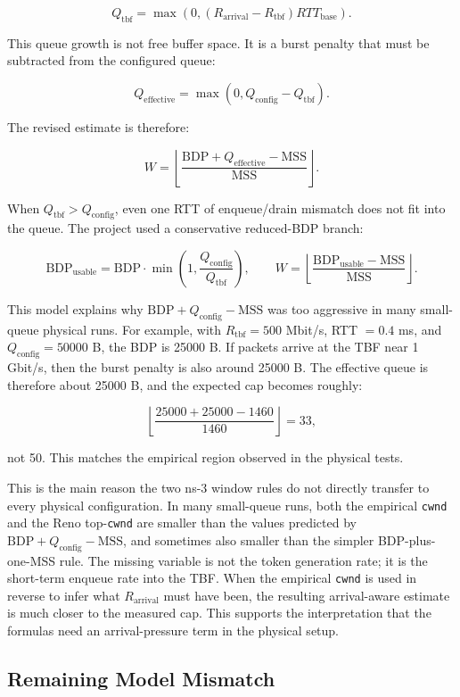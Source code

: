 \documentclass{article}
\newcommand{\code}[1]{\texttt{#1}}
\newcommand{\mss}{\mathrm{MSS}}
\newcommand{\bdp}{\mathrm{BDP}}
\begin{document}
\[
Q_{\mathrm{tbf}} =
\max(0, (R_{\mathrm{arrival}} - R_{\mathrm{tbf}}) RTT_{\mathrm{base}}).
\]

This queue growth is not free buffer space. It is a burst penalty that must be subtracted from the configured queue:

\[
Q_{\mathrm{effective}} = \max(0, Q_{\mathrm{config}} - Q_{\mathrm{tbf}}).
\]

The revised estimate is therefore:

\[
W =
\left\lfloor
\frac{\bdp + Q_{\mathrm{effective}} - \mss}{\mss}
\right\rfloor .
\]

When \(Q_{\mathrm{tbf}} > Q_{\mathrm{config}}\), even one RTT of enqueue/drain mismatch does not fit into the 
queue. The project used a conservative reduced-BDP branch:

\[
\bdp_{\mathrm{usable}} =
\bdp \cdot \min\left(1, \frac{Q_{\mathrm{config}}}{Q_{\mathrm{tbf}}}\right),
\qquad
W =
\left\lfloor
\frac{\bdp_{\mathrm{usable}} - \mss}{\mss}
\right\rfloor .
\]

This model explains why \(\bdp + Q_{\mathrm{config}} - \mss\) was too aggressive in many small-queue physical runs. 
For example, with \(R_{\mathrm{tbf}} = 500\) Mbit/s, RTT \(=0.4\) ms, and \(Q_{\mathrm{config}} = 50000\) B, 
the BDP is 25000 B. If packets arrive at the TBF near 1 Gbit/s, then the burst penalty is also around 25000 B. 
The effective queue is therefore about 25000 B, and the expected cap becomes roughly:

\[
\left\lfloor
\frac{25000 + 25000 - 1460}{1460}
\right\rfloor
= 33,
\]

not 50. This matches the empirical region observed in the physical tests.

This is the main reason the two ns-3 window rules do not directly transfer to every physical configuration. In many 
small-queue runs, both the empirical \code{cwnd} and the Reno top-\code{cwnd} are smaller than the values predicted by 
\(\bdp + Q_{\mathrm{config}} - \mss\), and sometimes also smaller than the simpler BDP-plus-one-MSS rule. The missing 
variable is not the token generation rate; it is the short-term enqueue rate into the TBF. When the empirical \code{cwnd} 
is used in reverse to infer what \(R_{\mathrm{arrival}}\) must have been, the resulting arrival-aware estimate is much 
closer to the measured cap. This supports the interpretation that the formulas need an arrival-pressure term in the 
physical setup.

\subsection{Remaining Model Mismatch}
\end{document}
